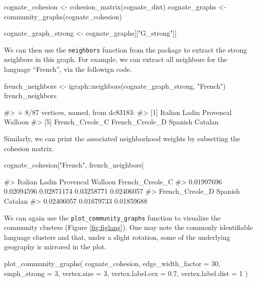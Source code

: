 \begin{Schunk}
\begin{Sinput}
cognate_cohesion <- cohesion_matrix(cognate_dist)
cognate_graphs <- community_graphs(cognate_cohesion)

cognate_graph_strong <- cognate_graphs[["G_strong"]]
\end{Sinput}
\end{Schunk}

We can then use the \texttt{neighbors} function from the
 package to extract the strong neighbors in this graph.
For example, we can extract all neighbors for the language ``French'',
via the followign code.

\begin{Schunk}
\begin{Sinput}
french_neighbors <- igraph::neighbors(cognate_graph_strong, "French")
french_neighbors
\end{Sinput}
\begin{Soutput}
#> + 8/87 vertices, named, from dc83183:
#> [1] Italian         Ladin           Provencal       Walloon        
#> [5] French_Creole_C French_Creole_D Spanish         Catalan
\end{Soutput}
\end{Schunk}

Similarly, we can print the associated neighborhood weights by
subsetting the cohesion matrix.

\begin{Schunk}
\begin{Sinput}
cognate_cohesion["French", french_neighbors]
\end{Sinput}
\begin{Soutput}
#>         Italian           Ladin       Provencal         Walloon French_Creole_C 
#>      0.01997696      0.02094596      0.02871174      0.03258771      0.02406057 
#> French_Creole_D         Spanish         Catalan 
#>      0.02406057      0.01679733      0.01859688
\end{Soutput}
\end{Schunk}

We can again use the \texttt{plot\_community\_graphs} function to
visualize the community clusters (Figure \ref{fig:figlang}). One may
note the commonly identifiable language clusters and that, under a
slight rotation, some of the underlying geography is mirrored in the
plot.

\begin{Schunk}
\begin{Sinput}
plot_community_graphs(
  cognate_cohesion,
  edge_width_factor = 30,
  emph_strong = 3,
  vertex.size = 3,
  vertex.label.cex = 0.7,
  vertex.label.dist = 1
)
\end{Sinput}
\end{Schunk}

